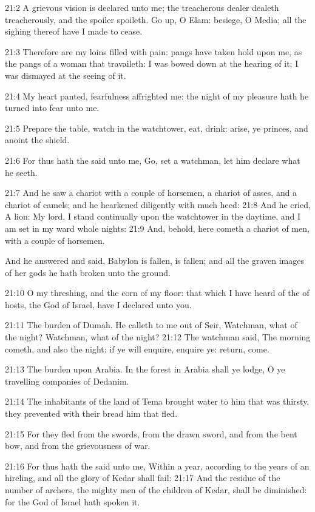 21:2 A grievous vision is declared unto me; the treacherous dealer
dealeth treacherously, and the spoiler spoileth. Go up, O Elam:
besiege, O Media; all the sighing thereof have I made to cease.

21:3 Therefore are my loins filled with pain: pangs have taken hold
upon me, as the pangs of a woman that travaileth: I was bowed down at
the hearing of it; I was dismayed at the seeing of it.

21:4 My heart panted, fearfulness affrighted me: the night of my
pleasure hath he turned into fear unto me.

21:5 Prepare the table, watch in the watchtower, eat, drink: arise, ye
princes, and anoint the shield.

21:6 For thus hath the \LORD said unto me, Go, set a watchman, let him
declare what he seeth.

21:7 And he saw a chariot with a couple of horsemen, a chariot of
asses, and a chariot of camels; and he hearkened diligently with much
heed: 21:8 And he cried, A lion: My lord, I stand continually upon the
watchtower in the daytime, and I am set in my ward whole nights: 21:9
And, behold, here cometh a chariot of men, with a couple of horsemen.

And he answered and said, Babylon is fallen, is fallen; and all the
graven images of her gods he hath broken unto the ground.

21:10 O my threshing, and the corn of my floor: that which I have
heard of the \LORD of hosts, the God of Israel, have I declared unto
you.

21:11 The burden of Dumah. He calleth to me out of Seir, Watchman,
what of the night? Watchman, what of the night?  21:12 The watchman
said, The morning cometh, and also the night: if ye will enquire,
enquire ye: return, come.

21:13 The burden upon Arabia. In the forest in Arabia shall ye lodge,
O ye travelling companies of Dedanim.

21:14 The inhabitants of the land of Tema brought water to him that
was thirsty, they prevented with their bread him that fled.

21:15 For they fled from the swords, from the drawn sword, and from
the bent bow, and from the grievousness of war.

21:16 For thus hath the \LORD said unto me, Within a year, according to
the years of an hireling, and all the glory of Kedar shall fail: 21:17
And the residue of the number of archers, the mighty men of the
children of Kedar, shall be diminished: for the \LORD God of Israel
hath spoken it.

